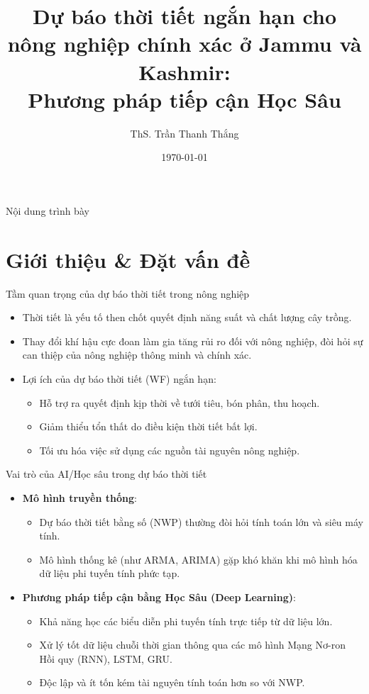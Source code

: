 \documentclass[aspectratio=169]{beamer}
\title[Dự báo thời tiết với Học Sâu]{Dự báo thời tiết ngắn hạn cho nông nghiệp chính xác ở Jammu và Kashmir:\\Phương pháp tiếp cận Học Sâu}
\author[GV: Trần Thanh Thắng]{ThS. Trần Thanh Thắng}
\institute[Đông Á University]{Khoa Công nghệ thông tin\\Đại học Đông Á}
\date{\today}
\begin{document}
\begin{frame}
    \titlepage
\end{frame}

\begin{frame}{Nội dung trình bày}
    \tableofcontents
\end{frame}

\section{Giới thiệu \& Đặt vấn đề}

\begin{frame}{Tầm quan trọng của dự báo thời tiết trong nông nghiệp}
    \begin{itemize}
        \item Thời tiết là yếu tố then chốt quyết định năng suất và chất lượng cây trồng.
        \item Thay đổi khí hậu cực đoan làm gia tăng rủi ro đối với nông nghiệp, đòi hỏi sự can thiệp của nông nghiệp thông minh và chính xác.
        \item Lợi ích của dự báo thời tiết (WF) ngắn hạn:
        \begin{itemize}
            \item Hỗ trợ ra quyết định kịp thời về tưới tiêu, bón phân, thu hoạch.
            \item Giảm thiểu tổn thất do điều kiện thời tiết bất lợi.
            \item Tối ưu hóa việc sử dụng các nguồn tài nguyên nông nghiệp.
        \end{itemize}
    \end{itemize}
\end{frame}

\begin{frame}{Vai trò của AI/Học sâu trong dự báo thời tiết}
    \begin{itemize}
        \item \textbf{Mô hình truyền thống}: 
        \begin{itemize}
            \item Dự báo thời tiết bằng số (NWP) thường đòi hỏi tính toán lớn và siêu máy tính.
            \item Mô hình thống kê (như ARMA, ARIMA) gặp khó khăn khi mô hình hóa dữ liệu phi tuyến tính phức tạp.
        \end{itemize}
        \item \textbf{Phương pháp tiếp cận bằng Học Sâu (Deep Learning)}:
        \begin{itemize}
            \item Khả năng học các biểu diễn phi tuyến tính trực tiếp từ dữ liệu lớn.
            \item Xử lý tốt dữ liệu chuỗi thời gian thông qua các mô hình Mạng Nơ-ron Hồi quy (RNN), LSTM, GRU.
            \item Độc lập và ít tốn kém tài nguyên tính toán hơn so với NWP.
        \end{itemize}
    \end{itemize}
\end{frame}
\end{document}
